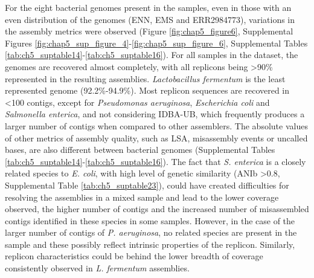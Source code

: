 For the eight bacterial genomes present in the samples, even in those with an even distribution of the genomes (ENN, EMS and ERR2984773), variations in the assembly metrics were observed (Figure \ref{fig:chap5_figure6}, Supplemental Figures \ref{fig:chap5_sup_figure_4}-\ref{fig:chap5_sup_figure_6}, Supplemental Tables \ref{tab:ch5_suptable14}-\ref{tab:ch5_suptable16}).  For all samples in the dataset, the genomes are recovered almost completely, with all replicons being >90\% represented in the resulting assemblies. \textit{Lactobacillus fermentum} is the least represented genome (92.2\%-94.9\%). Most replicon sequences are recovered in <100 contigs, except for \textit{Pseudomonas aeruginosa}, \textit{Escherichia coli} and \textit{Salmonella enterica}, and not considering IDBA-UB, which frequently produces a larger number of contigs when compared to other assemblers. The absolute values of other metrics of assembly quality, such as \ac{LSA}, misassembly events or uncalled bases, are also different between bacterial genomes (Supplemental Tables \ref{tab:ch5_suptable14}-\ref{tab:ch5_suptable16}). The fact that \textit{S. enterica} is a closely related species to \textit{E. coli}, with high level of genetic similarity (ANIb >0.8, Supplemental Table \ref{tab:ch5_suptable23}), could have created difficulties for resolving the assemblies in a mixed sample and lead to the lower coverage observed, the higher number of contigs and the increased number of misassembled contigs identified in these species in some samples. However, in the case of the larger number of contigs of \textit{P. aeruginosa}, no related species are present in the sample and these possibly reflect intrinsic properties of the replicon. Similarly, replicon characteristics could be behind the lower breadth of coverage consistently observed in \textit{L. fermentum} assemblies. 

